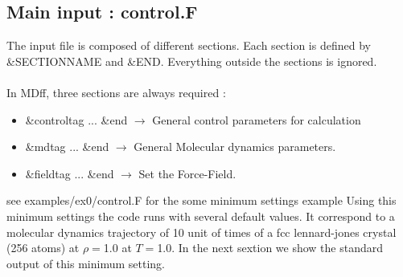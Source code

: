 \documentclass[a4paper]{article}
\newcommand{\MDFF}{{\sc MDff}}
\begin{document}
\subsection{Main input : control.F}

The input file is composed of different sections. 
Each section is defined by  \&SECTIONNAME and \&END.
Everything outside the sections is ignored.
\\
\\
In \MDFF, three sections are always required :

\begin{itemize}
\item \&controltag ... \&end $\rightarrow$ General control parameters for calculation 
\item \&mdtag ... \&end      $\rightarrow$ General Molecular dynamics parameters.
\item \&fieldtag ... \&end   $\rightarrow$ Set the Force-Field.
\end{itemize}

see examples/ex0/control.F for the some minimum settings example
Using this minimum settings the code runs with several default values.
It correspond to a molecular dynamics trajectory of 10 unit of times of a fcc lennard-jones 
crystal (256 atoms) at $\rho=$1.0 at $T=$1.0. In the next sextion we show the standard output of this minimum setting. 

\clearpage
\end{document}
